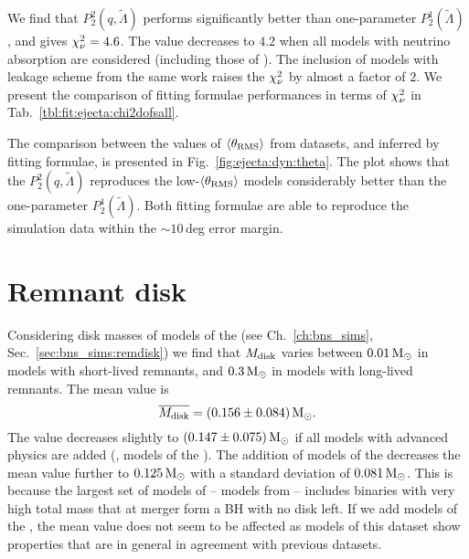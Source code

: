We find that $P_2^2(q,\tilde\Lambda)$ performs significantly better than one-parameter 
$P_2^1(\tilde\Lambda)$, and gives $\chi_{\nu}^2=4.6$. The value decreases to $4.2$ when 
all models with neutrino absorption are considered (including those of \citet{Radice:2018pdn}).
The inclusion of models with leakage scheme from the same work raises the $\chi_{\nu}^2$ by almost 
a factor of $2$. 
We present the comparison of fitting formulae performances in terms of $\chi_{\nu}^2$ in 
Tab.~\ref{tbl:fit:ejecta:chi2dofsall}.

The comparison between the values of $\langle\theta_{\rm RMS}\rangle$ from datasets, and inferred by 
fitting formulae, is presented in Fig.~\ref{fig:ejecta:dyn:theta}.
The plot shows that the $P_2^2(q,\tilde{\Lambda})$ reproduces  
the low-$\langle\theta_{\rm RMS}\rangle$ models considerably better than the one-parameter $P_2^1(\tilde{\Lambda})$.
Both fitting formulae are able to reproduce the simulation data within 
the ${\sim}10\,$deg
error margin.
%


\section{Remnant disk}
\label{sec:stat:remdisk}


Considering disk masses of models of the \DSrefset{} 
(see Ch.~\ref{ch:bns_sims}, Sec.~\ref{sec:bns_sims:remdisk}) 
we find that $M_{\rm disk}$ varies between $0.01\,{\text{M}_{\odot}}$ in 
models with short-lived remnants, and $0.3\,{\text{M}_{\odot}}$ in models with 
long-lived remnants.
%
The mean value is  
%
\begin{equation}
\overline{M_{\rm disk}} = (0.156 \pm 0.084)\,{\text{M}_{\odot}}.
\end{equation}
%
The value decreases slightly to $(0.147 \pm 0.075)\,{\text{M}_{\odot}}$ if all models with 
advanced physics are added (\ie, models of the \DSheatcool{}). 
The addition of models of the \DScool{} decreases the mean value further to $0.125\,{\text{M}_{\odot}}$ 
with a standard deviation of $0.081\,{\text{M}_{\odot}}$. This is because the largest set 
of models of \DScool{} -- models from \citet{Radice:2018pdn} -- includes 
binaries with very high total mass that at merger form a \ac{BH} with no disk left. 
%
If we add models of the \DSnone{}, the mean value %
does not seem to be affected as models of this dataset show 
properties that are in general in agreement with previous datasets.

